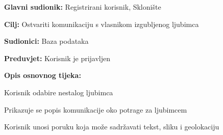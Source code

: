 					\pagebreak
					\noindent {}
					\begin{packed_item}
						
						\item \textbf{Glavni sudionik: }Registrirani korisnik, Sklonište
						\item  \textbf{Cilj:} Ostvariti komunikaciju s vlasnikom izgubljenog ljubimca
						\item  \textbf{Sudionici:} Baza podataka
						\item  \textbf{Preduvjet:} Korisnik je prijavljen
						\item  \textbf{Opis osnovnog tijeka:}
						
						\item[] \begin{packed_enum}
							
							\item Korisnik odabire nestalog ljubimca
							\item Prikazuje se popis komunikacije oko potrage za ljubimcem
							\item Korisnik unosi poruku koja može sadržavati tekst, sliku i geolokaciju
						\end{packed_enum}
					\end{packed_item}
					
